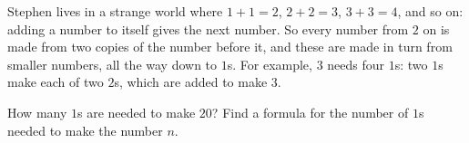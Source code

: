 Stephen lives in a strange world where $1+1=2$, $2+2=3$, $3+3=4$, and so on: adding a number to itself gives the next number. So every number from $2$ on is made from two copies of the number before it, and these are made in turn from smaller numbers, all the way down to $1$s. For example, $3$ needs four $1$s: two $1$s make each of two $2$s, which are added to make $3$.

How many $1$s are needed to make $20$? Find a formula for the number of $1$s needed to make the number $n$.
